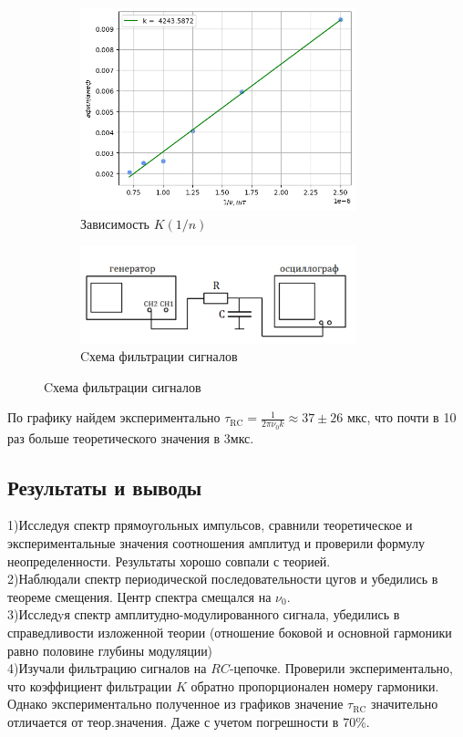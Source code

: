 \begin{figure}[!h]
\begin{subfigure}[b]{0.48\linewidth}
    \centering
    \includegraphics[width=8cm]{plot6.png}
    \caption{Зависимость $K(1/n)$}
\end{subfigure}
\hfill
\begin{subfigure}[b]{0.48\linewidth}
    \centering
    \includegraphics[width=8cm]{./images/setup.png}
    \caption{Cхема фильтрации сигналов}
\end{subfigure}
\end{figure}
По графику найдем экспериментально $\tau_{\text{RC}} = \frac{1}{2\pi\nu_0 k} \approx 37\pm26$ мкс, что почти в 10 раз больше теоретического значения в 3мкс. 

\subsection*{Результаты и выводы}
1)Исследуя спектр прямоугольных импульсов, сравнили теоретическое и экспериментальные значения соотношения амплитуд и проверили формулу неопределенности. Результаты хорошо совпали с теорией.\\ 
2)Наблюдали спектр периодической последовательности цугов и убедились в теореме смещения. Центр спектра смещался на $\nu_0$.\\ 
3)Исследyя спектр амплитудно-модулированного сигнала, убедились в справедливости изложенной теории (отношение боковой и основной гармоники равно половине глубины модуляции)\\
4)Изучали фильтрацию сигналов на $RC$-цепочке. Проверили экспериментально, что коэффициент фильтрации $K$ обратно пропорционален номеру гармоники. Однако экспериментально полученное из графиков значение $\tau_{\text{RC}}$ значительно отличается от теор.значения. Даже с учетом погрешности в 70\%.


